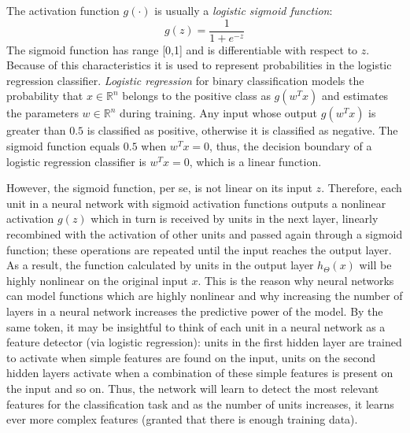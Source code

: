 The activation function $g(\cdot)$ is usually a \emph{logistic sigmoid function}:
\begin{equation}
	g(z) = \frac{1}{1+ e^{-z}}
\end{equation}
The sigmoid function has range [0,1] and is differentiable with respect to $z$. Because of this characteristics it is used to represent probabilities in the logistic regression classifier. \emph{Logistic regression} for binary classification models the probability that $x \in \mathbb{R}^n$ belongs to the positive class as $g(w^Tx)$ and estimates the parameters $w \in \mathbb{R}^n$ during training. Any input whose output $g(w^Tx)$ is greater than $0.5$ is classified as positive, otherwise it is classified as negative. The sigmoid function equals $0.5$ when $w^Tx = 0$, thus, the decision boundary of a logistic regression classifier is $w^Tx = 0$, which is a linear function. 

However, the sigmoid function, per se, is not linear on its input $z$. Therefore, each unit in a neural network with sigmoid activation functions outputs a nonlinear activation $g(z)$ which in turn is received by units in the next layer, linearly recombined with the activation of other units and passed again through a sigmoid function; these operations are repeated until the input reaches the output layer. As a result, the function calculated by units in the output layer $h_\Theta(x)$ will be highly nonlinear on the original input $x$. This is the reason why neural networks can model functions which are highly nonlinear and why increasing the number of layers in a neural network increases the predictive power of the model. By the same token, it may be insightful to think of each unit in a neural network as a feature detector (via logistic regression): units in the first hidden layer are trained to activate when simple features are found on the input, units on the second hidden layers activate when a combination of these simple features is present on the input and so on. Thus, the network will learn to detect the most relevant features for the classification task and as the number of units increases, it learns ever more complex features (granted that there is enough training data).


